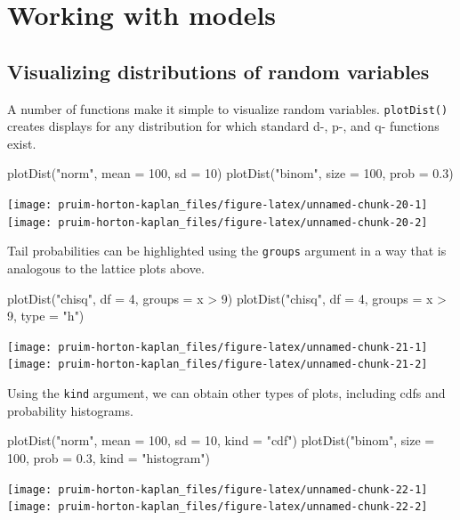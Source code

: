 \section{Working with models}\label{working-with-models}

\subsection{Visualizing distributions of random
variables}\label{visualizing-distributions-of-random-variables}

A number of functions make it simple to visualize random variables.
\texttt{plotDist()} creates displays for any distribution for which
standard d-, p-, and q- functions exist.

\begin{Schunk}
\begin{Sinput}
plotDist("norm", mean = 100, sd = 10)
plotDist("binom", size = 100, prob = 0.3)
\end{Sinput}


\begin{center}\texttt{[image: pruim-horton-kaplan\_files/figure-latex/unnamed-chunk-20-1]} \texttt{[image: pruim-horton-kaplan\_files/figure-latex/unnamed-chunk-20-2]} \end{center}

\end{Schunk}

\noindent
Tail probabilities can be highlighted using the \texttt{groups} argument
in a way that is analogous to the lattice plots above.

\begin{Schunk}
\begin{Sinput}
plotDist("chisq", df = 4, groups = x > 9)
plotDist("chisq", df = 4, groups = x > 9, type = "h")
\end{Sinput}


\begin{center}\texttt{[image: pruim-horton-kaplan\_files/figure-latex/unnamed-chunk-21-1]} \texttt{[image: pruim-horton-kaplan\_files/figure-latex/unnamed-chunk-21-2]} \end{center}

\end{Schunk}

\noindent
Using the \texttt{kind} argument, we can obtain other types of plots,
including cdfs and probability histograms.

\begin{Schunk}
\begin{Sinput}
plotDist("norm", mean = 100, sd = 10, kind = "cdf")
plotDist("binom", size = 100, prob = 0.3, kind = "histogram")
\end{Sinput}


\begin{center}\texttt{[image: pruim-horton-kaplan\_files/figure-latex/unnamed-chunk-22-1]} \texttt{[image: pruim-horton-kaplan\_files/figure-latex/unnamed-chunk-22-2]} \end{center}

\end{Schunk}

